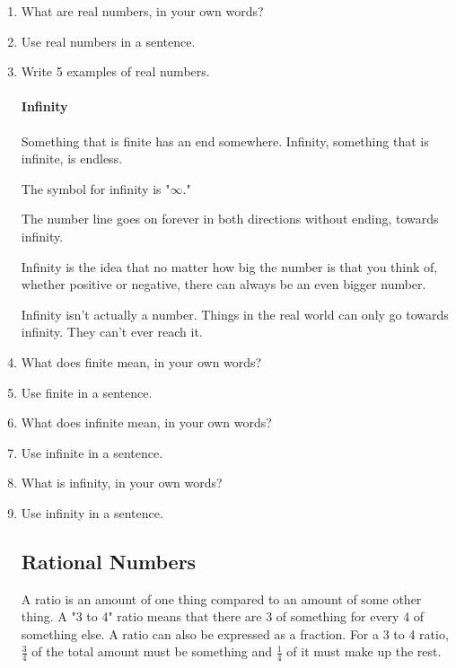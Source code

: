 \documentclass{article}
\begin{document}
\begin{enumerate}
\item What are real numbers, in your own words?
\item Use real numbers in a sentence.
\item Write 5 examples of real numbers.

\paragraph{Infinity}

Something that is finite has an end somewhere. Infinity, something that is infinite, is endless.

The symbol for infinity is "$\infty.$"


The number line goes on forever in both directions without ending, towards infinity.

Infinity is the idea that no matter how big the number is that you think of, whether positive or negative, there can always be an even bigger number.

Infinity isn't actually a number. Things in the real world can only go towards infinity. They can't ever reach it.

\item What does finite mean, in your own words?
\item Use finite in a sentence.
\item What does infinite mean, in your own words?
\item Use infinite in a sentence.
\item What is infinity, in your own words?
\item Use infinity in a sentence.

\subsection*{Rational Numbers}

A ratio is an amount of one thing compared to an amount of some other thing. A "3 to 4" ratio means that there are 3 of something for every 4 of something else. A ratio can also be expressed as a fraction. For a 3 to 4 ratio, $\frac{3}{4}$ of the total amount must be something and $\frac{1}{4}$ of it must make up the rest.\\


\end{enumerate}
\end{document}
